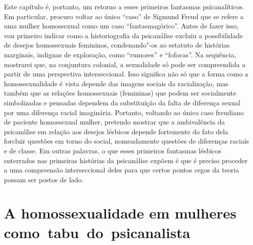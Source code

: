 Este capítulo é, portanto, um retorno a esses primeiros fantasmas
psicanalíticos. Em particular, procuro voltar ao único ``caso'' de
Sigmund Freud que se refere a uma mulher homossexual como um caso
``fantasmagórico''. Antes de fazer isso, vou primeiro indicar como a
historiografia da psicanálise excluiu a possibilidade de desejos
homossexuais femininos, condenando"-os ao estatuto de histórias
marginais, indignas de exploração, como ``rumores'' e ``fofocas''. Na
sequência, mostrarei que, na conjuntura colonial, a sexualidade só pode
ser compreendida a partir de uma perspectiva interseccional. Isso
significa não só que a forma como a homossexualidade é vista depende das
imagens sociais da racialização, mas também que as relações homossexuais
(femininas) que podem ser socialmente simbolizadas e pensadas dependem
da substituição da falta de diferença sexual por uma diferença racial
imaginária. Portanto, voltando ao único caso freudiano de paciente
homossexual mulher, pretendo mostrar que a ambivalência da psicanálise
em relação aos desejos lésbicos depende fortemente do fato dela forcluir
questões em torno do social, nomeadamente questões de diferenças raciais
e de classe. Em outras palavras, o que esses primeiros fantasmas
lésbicos enterrados nas primeiras histórias da psicanálise expõem é que
é preciso proceder a uma compreensão interseccional deles para que
certos pontos cegos da teoria possam ser postos de lado.

\section{A homossexualidade em mulheres como~tabu~do~psicanalista}


